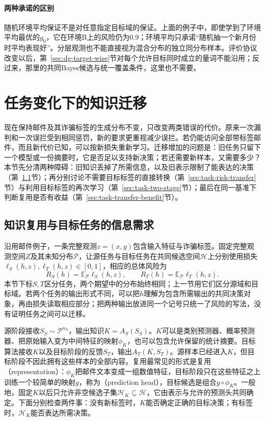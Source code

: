 \paragraph{两种承诺的区别}
随机环境平均保证不是对任意指定目标域的保证。上面的例子中，即使学到了环境平均最优的$g_0$，它在环境B上的风险仍为0.9；环境平均只承诺“随机抽一个新月份时平均表现好”。分层观测也不能直接视为混合分布的独立同分布样本。评价协议改变以后，第~\ref{sec:dg-target-wise}节对每个允许目标同时成立的量词不能沿用；反过来，那里的共同Bayes候选与统一覆盖条件，这里也不需要。
\section{任务变化下的知识迁移}
\label{sec:task-transfer-learnability}

现在保持邮件及其诈骗标签的生成分布不变，只改变两类错误的代价。原来一次漏判和一次误拦受到相同惩罚，新的要求更重视减少误拦。若仍能访问全部带标签邮件，而且新代价已知，可以按新损失重新学习。迁移增加的问题是：旧任务只留下一个模型或一份摘要时，它是否足以支持新决策；若还需要新样本，又需要多少？本节先分清两种障碍：旧知识丢掉了所需信息，以及旧表示限制了能表达的决策（第~\ref{sec:task-information-needs}节）；再分别讨论不需要目标标签的直接转换（第~\ref{sec:task-risk-transfer}节）与利用目标标签的再次学习（第~\ref{sec:task-two-stage}节）；最后在同一基准下判断复用是否有收益（第~\ref{sec:task-transfer-benefit}节）。

\subsection{知识复用与目标任务的信息需求}
\label{sec:task-information-needs}

沿用邮件例子，一条完整观测$z=(x,y)$包含输入特征与诈骗标签。固定完整观测空间$Z$及其未知分布$\mathcal P$，让源任务与目标任务在共同候选空间$\mathcal H$上分别使用损失$\ell_S(h,z),\ell_T(h,z)\in[0,1]$，相应的总体风险为
\[
 R_S(h)=\mathbb E_{\mathcal P}\ell_S(h,z),\qquad
 R_T(h)=\mathbb E_{\mathcal P}\ell_T(h,z).
\]
本节下标$S,T$区分任务，两个期望中的分布始终相同；上一节用它们区分源域和目标域。若两个任务的输出形式不同，可以把$h$理解为包含所需输出的共同决策对象，再由损失读取相应部分；把两种输出放进同一个记号只统一了风险的写法，没有证明任务之间可以迁移。

源阶段接收$S_S\sim\mathcal P^{n_S}$，输出知识$K=A_S(S_S)$。$K$可以是类别预测器、概率预测器、把原始输入变为中间特征的映射$\phi_K$，也可以包含允许保留的统计摘要。目标算法接收$K$以及目标阶段的反馈$S_T$，输出$A_T(K,S_T)$。源样本已经进入$K$，但目标阶段不因此拥有这些样本的全部内容。复用最常见的形式是复用（representation）：$\phi_K$把邮件文本变成一组数值特征，目标阶段只在这些特征之上训练一个较简单的映射$g$，称为（prediction head），目标候选是组合$g\circ\phi_K$。一般地，固定$K$以后只允许非空候选子集$\mathcal H_K\subseteq\mathcal H$，它由表示与允许的预测头共同确定。下面分别检查两件事：没有新标签时，$K$能否确定正确的目标决策；有标签时，$\mathcal H_K$能否表达所需决策。

